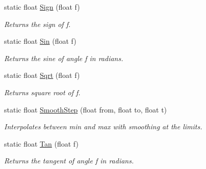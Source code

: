 \begin{DoxyCompactItemize}
static float \mbox{\hyperlink{class_lua_1_1_mathf_ae5d3654f321079c30baaf42bdf226d89}{Sign}} (float f)
\begin{DoxyCompactList}\small\item\em Returns the sign of f. \end{DoxyCompactList}\item 
static float \mbox{\hyperlink{class_lua_1_1_mathf_a23fb3f1fdbc09b29120c653bb184fb96}{Sin}} (float f)
\begin{DoxyCompactList}\small\item\em Returns the sine of angle f in radians. \end{DoxyCompactList}\item 
static float \mbox{\hyperlink{class_lua_1_1_mathf_aa20bfd858dc30b96f3fb7a5033c4b6bf}{Sqrt}} (float f)
\begin{DoxyCompactList}\small\item\em Returns square root of f. \end{DoxyCompactList}\item 
static float \mbox{\hyperlink{class_lua_1_1_mathf_afee5fd526c03b9d4f8f5e6fc978e04b8}{Smooth\+Step}} (float from, float to, float t)
\begin{DoxyCompactList}\small\item\em Interpolates between min and max with smoothing at the limits. \end{DoxyCompactList}\item 
static float \mbox{\hyperlink{class_lua_1_1_mathf_aefc20a4773c6e7ce2f493974dbdf27c1}{Tan}} (float f)
\begin{DoxyCompactList}\small\item\em Returns the tangent of angle f in radians. \end{DoxyCompactList}\end{DoxyCompactItemize}
